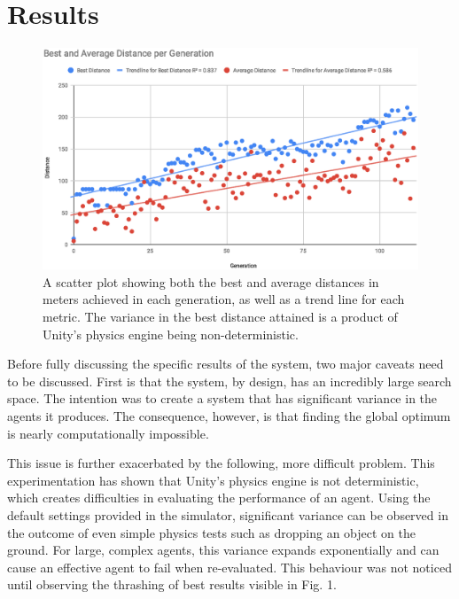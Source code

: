 \documentclass[runningheads]{llncs}
\begin{document}
\section{Results}
\begin{figure}
    \begin{center}
    \includegraphics[width=1\textwidth]{DistanceChart}
    \end{center}
    \caption[ ]{
        A scatter plot showing both the best and average distances in meters achieved in each generation, as well as a trend line for each metric.
        The variance in the best distance attained is a product of Unity's physics engine being non-deterministic.
    } 
    \label{fig:DistanceChart} 
\end{figure}

Before fully discussing the specific results of the system, two major caveats need to be discussed.
First is that the system, by design, has an incredibly large search space.
The intention was to create a system that has significant variance in the agents it produces.
The consequence, however, is that finding the global optimum is nearly computationally impossible.

This issue is further exacerbated by the following, more difficult problem.
This experimentation has shown that Unity's physics engine is not deterministic, which creates difficulties in evaluating the performance of an agent.
Using the default settings provided in the simulator, significant variance can be observed in the outcome of even simple physics tests such as dropping an object on the ground.
For large, complex agents, this variance expands exponentially and can cause an effective agent to fail when re-evaluated.
This behaviour was not noticed until observing the thrashing of best results visible in Fig. 1.
\end{document}
